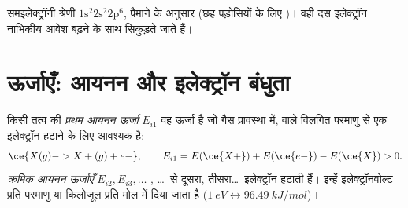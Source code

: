 \begin{omfigure}

{\small समइलेक्ट्रॉनी श्रेणी $1\text{s}^2 2\text{s}^2 2\text{p}^6$,
पैमाने के अनुसार (छह पड़ोसियों के लिए )। वही दस इलेक्ट्रॉन
नाभिकीय आवेश बढ़ने के साथ सिकुड़ते जाते हैं।}
\end{omfigure}

\section{ऊर्जाएँ: आयनन और इलेक्ट्रॉन बंधुता}

\begin{definition}[आयनन ऊर्जाएँ]\label{def:b1:periodicity:ionisation-energy}
किसी तत्व की \emph{प्रथम आयनन ऊर्जा} $E_{i1}$
वह ऊर्जा है जो गैस प्रावस्था में,  वाले विलगित परमाणु से एक इलेक्ट्रॉन
हटाने के लिए आवश्यक है:
\[
  \ce{X(g) -> X+(g) + e-}, \qquad E_{i1} = E(\ce{X+}) + E(\ce{e-}) - E(\ce{X}) > 0 .
\]
\emph{क्रमिक आयनन ऊर्जाएँ}
$E_{i2}, E_{i3}, \dots$ , \dots\ से दूसरा, तीसरा\dots\
इलेक्ट्रॉन हटाती हैं। इन्हें
इलेक्ट्रॉनवोल्ट प्रति परमाणु या किलोजूल प्रति मोल में दिया जाता है
($\qty{1}{eV} \leftrightarrow \qty{96.49}{kJ/mol}$)।
\end{definition}

